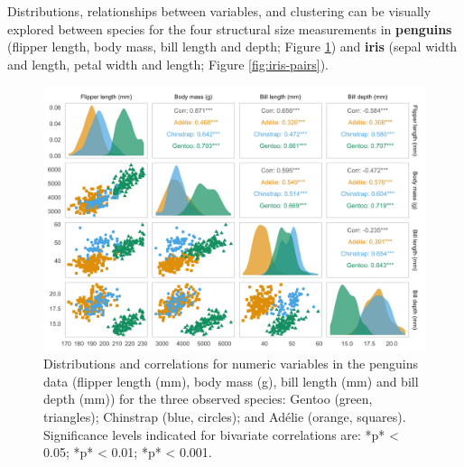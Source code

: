 Distributions, relationships between variables, and clustering can be
visually explored between species for the four structural size
measurements in \textbf{penguins} (flipper length, body mass, bill
length and depth; Figure \ref{fig:penguin-pairs}) and \textbf{iris}
(sepal width and length, petal width and length; Figure
\ref{fig:iris-pairs}).

\begin{Schunk}
\begin{figure}

{\centering \includegraphics[width=\textwidth]{figs/penguin-pairs-1} 

}

\caption[Distributions and correlations for numeric variables in the penguins data (flipper length (mm), body mass (g), bill length (mm) and bill depth (mm)) for the three observed species]{Distributions and correlations for numeric variables in the penguins data (flipper length (mm), body mass (g), bill length (mm) and bill depth (mm)) for the three observed species: Gentoo (green, triangles); Chinstrap (blue, circles); and Adélie (orange, squares). Significance levels indicated for bivariate correlations are: \**p* < 0.05; \*\**p* < 0.01; \*\*\**p* < 0.001.}\label{fig:penguin-pairs}
\end{figure}
\end{Schunk}

